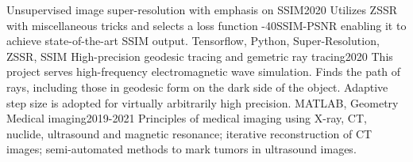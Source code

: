 %
%
%


\begin{projects}
    \project
    {Unsupervised image super-resolution with emphasis on SSIM}{2020}{}
    {Utilizes ZSSR with miscellaneous tricks and selects a loss function -40SSIM-PSNR enabling it to achieve state-of-the-art SSIM output.}
    {Tensorflow, Python, Super-Resolution, ZSSR, SSIM}
    \project
    {High-precision geodesic tracing and gemetric ray tracing}{2020}{}
    {This project serves high-frequency electromagnetic wave simulation. Finds the path of rays, including those in geodesic form on the dark side of the object. Adaptive step size is adopted for virtually arbitrarily high precision.}
    {MATLAB, Geometry}
    \project
    {Medical imaging}{2019-2021}{}
    {Principles of medical imaging using X-ray, CT, nuclide, ultrasound and magnetic resonance; iterative reconstruction of CT images; semi-automated methods to mark tumors in ultrasound images.}{}
				

\end{projects}